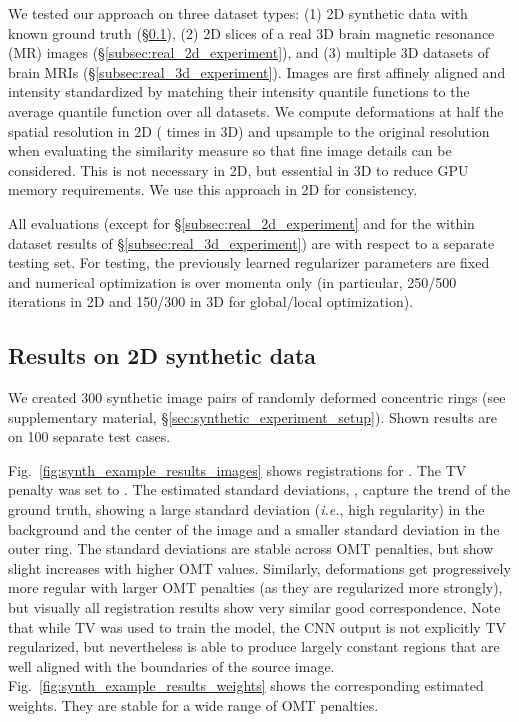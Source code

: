 \documentclass[10pt,twocolumn,letterpaper,table]{article}
\numberwithin{equation}{section}
\theoremstyle{plain}
\theoremstyle{definition}
\def\ie{\emph{i.e.}}  \def\Ie{\emph{I.e.}}
\begin{document}
We tested our approach on three dataset types: (1) 2D synthetic data with known ground truth (\S\ref{subsec:synthetic_experiment}), (2) 2D slices of a real 3D brain magnetic resonance (MR) images (\S\ref{subsec:real_2d_experiment}), and (3) multiple 3D datasets of brain MRIs (\S\ref{subsec:real_3d_experiment}). Images are first affinely aligned and intensity standardized by matching their intensity quantile functions to the average quantile function over all datasets. We compute deformations at half the spatial resolution in 2D  ( times in 3D) and upsample  to the original resolution when evaluating the similarity measure so that fine image details can be considered. This is not necessary in 2D, but essential in 3D to reduce GPU memory requirements. We use this approach in 2D for consistency. 

All evaluations (except for 
\S\ref{subsec:real_2d_experiment} and for the within dataset results of \S\ref{subsec:real_3d_experiment}) are with respect to a separate testing set. For testing, the previously learned regularizer parameters are fixed and numerical optimization is over momenta only (in particular, 250/500 iterations in 2D and 150/300 in 3D for global/local optimization).
  
\subsection{Results on 2D synthetic data}
\label{subsec:synthetic_experiment}

We created 300 synthetic   image pairs of randomly deformed concentric rings (see supplementary material, \S\ref{sec:synthetic_experiment_setup}). Shown results are on 100 separate test cases.

Fig.~\ref{fig:synth_example_results_images} shows registrations for . The TV penalty was set to . 
The estimated standard deviations, , capture the trend of the ground truth, showing a large standard deviation (\ie, high regularity) in the background and the center of the image and a smaller standard deviation in the outer ring. The standard deviations are stable across OMT penalties, but show slight increases with higher OMT values. Similarly, deformations get progressively more regular with larger OMT penalties (as they are regularized more strongly), but visually all registration results show very similar good correspondence.
Note that while TV was used to train the model, the CNN output is not explicitly TV regularized, but nevertheless is able to produce largely constant regions that are well aligned with the boundaries of the source image. Fig.~\ref{fig:synth_example_results_weights} shows the corresponding estimated weights. They are stable for a wide range of OMT penalties.
\end{document}
